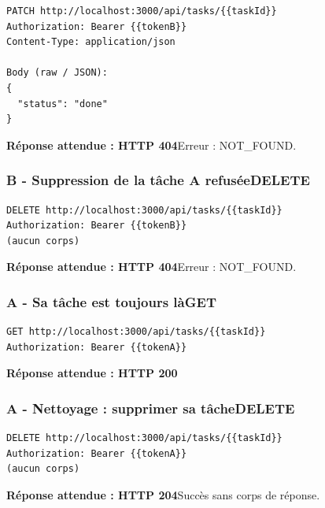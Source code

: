 \documentclass[10pt,a4paper]{article}
\newcommand{\expected}[2]{\par\smallskip\noindent\colorbox{forest!9}{\parbox{\dimexpr\linewidth-2\fboxsep}{\textcolor{forest}{\textbf{Réponse attendue : HTTP #1}}\hspace{0.4em}#2}}\par\medskip}
\newcommand{\reqheading}[3]{\subsubsection*{\textcolor{forest}{#1}\hfill\textcolor{ink}{\small #2}}\textit{#3}\par}
\begin{document}
\begin{lstlisting}[style=requestcode]
PATCH http://localhost:3000/api/tasks/{{taskId}}
Authorization: Bearer {{tokenB}}
Content-Type: application/json

Body (raw / JSON):
{
  "status": "done"
}
\end{lstlisting}
\expected{404}{Erreur : NOT\_FOUND.}
\vspace{0.25em}
\reqheading{B - Suppression de la tâche A refusée}{DELETE}{}
\begin{lstlisting}[style=requestcode]
DELETE http://localhost:3000/api/tasks/{{taskId}}
Authorization: Bearer {{tokenB}}
(aucun corps)
\end{lstlisting}
\expected{404}{Erreur : NOT\_FOUND.}
\vspace{0.25em}
\reqheading{A - Sa tâche est toujours là}{GET}{}
\begin{lstlisting}[style=requestcode]
GET http://localhost:3000/api/tasks/{{taskId}}
Authorization: Bearer {{tokenA}}
\end{lstlisting}
\expected{200}{}
\vspace{0.25em}
\reqheading{A - Nettoyage : supprimer sa tâche}{DELETE}{}
\begin{lstlisting}[style=requestcode]
DELETE http://localhost:3000/api/tasks/{{taskId}}
Authorization: Bearer {{tokenA}}
(aucun corps)
\end{lstlisting}
\expected{204}{Succès sans corps de réponse.}
\vspace{0.25em}
\newpage
\end{document}
